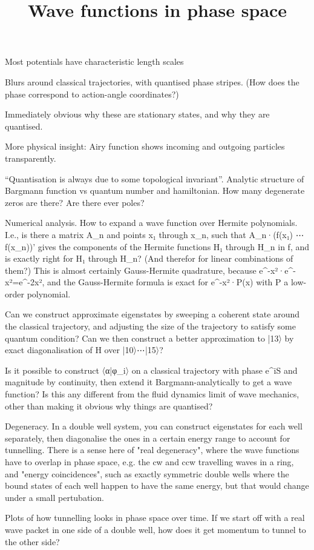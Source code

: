 \title{Wave functions in phase space}



Most potentials have characteristic length scales

Blurs around classical trajectories, with quantised phase stripes.  (How does the phase correspond to action-angle coordinates?)

Immediately obvious why these are stationary states, and why they are quantised.

More physical insight: Airy function shows incoming and outgoing particles transparently.

``Quantisation is always due to some topological invariant''.  Analytic structure of Bargmann function vs quantum number and hamiltonian.  How many degenerate zeros are there?  Are there ever poles?

Numerical analysis.  How to expand a wave function over Hermite polynomials.  I.e., is there a matrix A_n and points x₁ through x_n, such that A_n·(f(x₁) ⋯ f(x_n))' gives the components of the Hermite functions H₁ through H_n in f, and is exactly right for H₁ through H_n?  (And therefor for linear combinations of them?)  This is almost certainly Gauss-Hermite quadrature, because e^{-x²}·e^{-x²}=e^{-2x²}, and the Gauss-Hermite formula is exact for e^{-x²}·P(x) with P a low-order polynomial.

Can we construct approximate eigenstates by sweeping a coherent state around the classical trajectory, and adjusting the size of the trajectory to satisfy some quantum condition?  Can we then construct a better approximation to |13〉 by exact diagonalisation of H over |10〉⋯|15〉?

Is it possible to construct 〈α|φ_i〉 on a classical trajectory with phase e^{iS} and magnitude by continuity, then extend it Bargmann-analytically to get a wave function?  Is this any different from the fluid dynamics limit of wave mechanics, other than making it obvious why things are quantised?

Degeneracy.  In a double well system, you can construct eigenstates for each well separately, then diagonalise the ones in a certain energy range to account for tunnelling.  There is a sense here of "real degeneracy", where the wave functions have to overlap in phase space, e.g. the cw and ccw travelling waves in a ring, and "energy coincidences", such as exactly symmetric double wells where the bound states of each well happen to have the same energy, but that would change under a small pertubation.

Plots of how tunnelling looks in phase space over time.  If we start off with a real wave packet in one side of a double well, how does it get momentum to tunnel to the other side?

